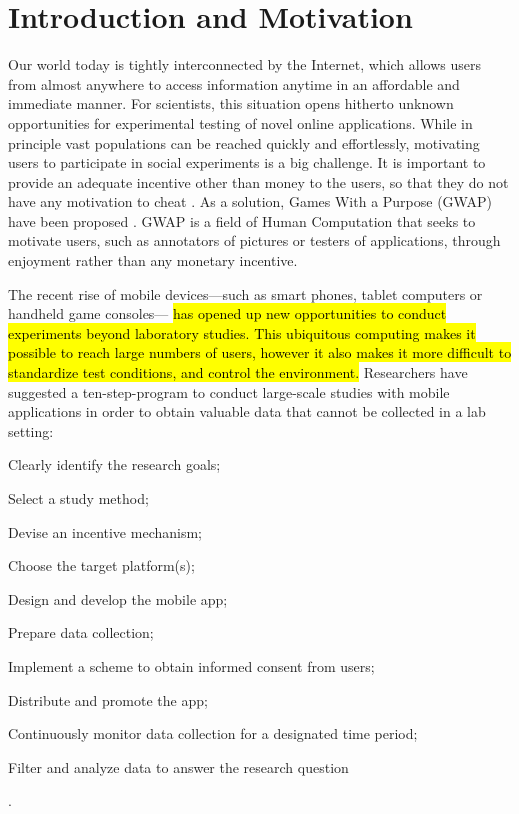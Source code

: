 \documentclass[preprint,authoryear,12pt]{elsarticle}
\newcommand{\hlc}[2][yellow]{ {\sethlcolor{#1} \hl{#2}} }
\begin{document}
\section{Introduction and Motivation}\label{sec:intro}



Our world today is tightly interconnected by the Internet, which allows users from almost anywhere to access information anytime in an affordable and immediate manner. For scientists, this situation opens hitherto unknown opportunities for experimental testing of novel online applications. While in principle vast populations can  be reached quickly and effortlessly, motivating users to participate in social experiments is a big challenge. It is important to provide an adequate incentive other than money to the users, so that they do not have any motivation to cheat \citep{Quinn}.
As a solution, Games With a Purpose (GWAP) have been proposed \citep{vonAhn2006Games}. GWAP is a field of Human Computation \citep{Yuen.2009,Krause+Smeddinck.2011} that seeks to motivate users, such as annotators of pictures or testers of applications, through enjoyment rather than any monetary incentive.

The recent rise of mobile devices---such as smart phones, tablet computers or handheld game consoles---
\hlc[green]{
has opened up new opportunities to conduct experiments beyond laboratory studies. This ubiquitous computing makes it possible to reach large numbers of users, however it also makes it more difficult to standardize test conditions, and control the environment.}
Researchers have suggested a ten-step-program to conduct large-scale studies with mobile applications in order to obtain valuable data that cannot be collected in a lab setting:
\begin{inparaenum}[\itshape 1\upshape)]\item Clearly identify the research goals; \item Select a study method; \item Devise an incentive mechanism;  \item Choose the target platform(s); \item Design and develop the mobile app; \item Prepare data collection; \item Implement a scheme to obtain informed consent from users; \item Distribute and promote the app; \item Continuously monitor data collection for a designated time period; \item Filter and analyze data to answer the research question \end{inparaenum} \citep{Henze2013}.
\end{document}
